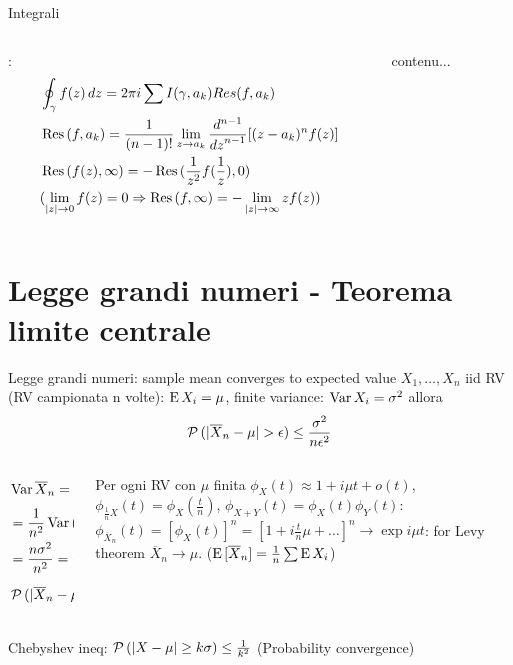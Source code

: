 \documentclass[asd-beamer.tex]{subfiles}
\begin{document}
\begin{frame}{Integrali}\frameintoc
\begin{columns}[T]
\begin{column}{0.5\textwidth}
:
\begin{align*}
&\oint_{\gamma}f(z)\,dz=2\pi i\sum I(\gamma,a_k)Res(f,a_k)\\
&\operatorname{Res}{(f, a_k)}=\frac{1}{(n-1)!}\lim_{z\to a_k}\frac{d^{n-1}}{{d z}^{n-1}}[(z-a_k)^nf(z)]\\
&\operatorname{Res}{(f(z),\infty)}=-\operatorname{Res}{(\frac{1}{z^2}f(\frac{1}{z}),0)}\\
&(\lim_{|z|\to0}f(z)=0\Rightarrow\operatorname{Res}{(f,\infty)}=-\lim_{|z|\to\infty}zf(z))
\end{align*}
\end{column}
\begin{column}{0.5\textwidth}
	contenu...
\end{column}
\end{columns}
\end{frame}

\section{Legge grandi numeri - Teorema limite centrale}

\begin{frame}{Legge grandi numeri: sample mean converges to expected value}
$X_1,\ldots,X_n$ iid RV (RV campionata n volte): $\operatorname{E}{X_i}=\mu$, finite variance: $\operatorname{Var}{X_i}=\sigma^2$ allora \[\prob{(|\overline{X}_n-\mu|>\epsilon)}\leq\frac{\sigma^2}{n\epsilon^2}\]
    \begin{columns}
    \begin{column}{0.4\textwidth}
\begin{align*}
&\var{\overline{X}_n}=\var{\frac{1}{n}(X_1+\ldots+X_n)}\\
&=\frac{1}{n^2}\var{(X_1+\ldots+X_n)}\\
&=\frac{n\sigma^2}{n^2}=\frac{\sigma^2}{n}\\
&\prob{(|\overline{X}_n-\mu|>\epsilon)}\leq\frac{\sigma^2}{n\epsilon^2}
\end{align*}
    \end{column}
    \begin{column}{0.6\textwidth}
Per ogni RV con $\mu$ finita 
$\phi_X(t)\approx1+i\mu t+o(t)$,$\phi_{\frac{1}{n}X}(t)=\phi_X(\frac{t}{n})$, $\phi_{X+Y}(t)=\phi_X(t)\phi_Y(t)$:
$\phi_{\overline{X}_n}(t)=[\phi_X(t)]^n=[1+i\frac{t}{n}\mu+\ldots]^n\to\exp{i\mu t}$: for Levy theorem $\overline{X}_n\to\mu$. ($\operatorname{E}{[\overline{X}_n]}=\frac{1}{n}\sum\operatorname{E}{X_i}$)
    \end{column}
    \end{columns}
Chebyshev ineq: $\operatorname{\mathcal{P}}{(|X-\mu|\geq k\sigma)}\leq\frac{1}{k^2}$ (Probability convergence)
\end{frame}
\end{document}
